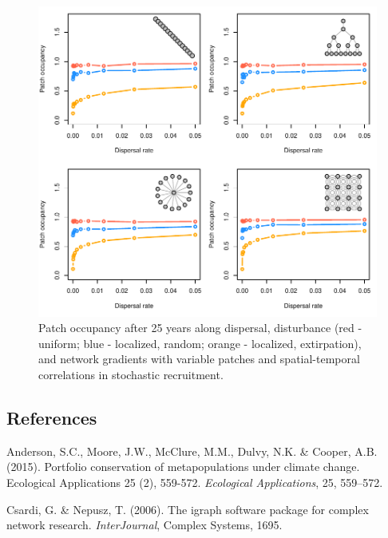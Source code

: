 \documentclass[]{article}
\begin{document}
\begin{figure}[H]

{\centering \includegraphics{Managing_for_ecological_surprises_in_metapopulations_files/figure-latex/patch occupancy with variable patches and space-time stochasticity-1} 

}

\caption{Patch occupancy after 25 years along dispersal, disturbance (red - uniform; blue - localized, random; orange - localized, extirpation), and network gradients with variable patches and spatial-temporal correlations in stochastic recruitment.}\label{fig:patch occupancy with variable patches and space-time stochasticity}
\end{figure}
\newpage

\hypertarget{references}{%
\subsection*{References}\label{references}}

\hypertarget{refs}{}
\leavevmode\hypertarget{ref-Anderson2015}{}%
Anderson, S.C., Moore, J.W., McClure, M.M., Dulvy, N.K. \& Cooper, A.B.
(2015). Portfolio conservation of metapopulations under climate change.
Ecological Applications 25 (2), 559-572. \emph{Ecological Applications},
25, 559--572.

\leavevmode\hypertarget{ref-igraph2006}{}%
Csardi, G. \& Nepusz, T. (2006). The igraph software package for complex
network research. \emph{InterJournal}, Complex Systems, 1695.
\end{document}
